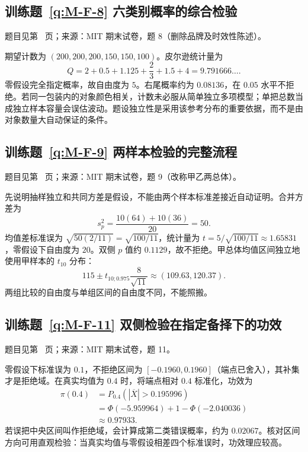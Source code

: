 \documentclass[UTF8,12pt,a4paper,fontset=fandol]{ctexbook}
\begin{document}
\subsection*{训练题~\ref{q:M-F-8} 六类别概率的综合检验}\label{a:M-F-8}{\small 题目见第~\pageref{q:M-F-8} 页；来源：MIT 期末试卷，题 8（删除品牌及时效性陈述）。}
\begin{solve}期望计数为 $(200,200,200,150,150,100)$。皮尔逊统计量为\[Q=2+0.5+1.125+\frac23+1.5+4=9.791666\ldots.\]零假设完全指定概率，故自由度为 $5$。右尾概率约为 $0.08136$，在 $0.05$ 水平不拒绝。若同一包装内的对象颜色相关，计数未必服从简单独立多项模型；单把总数当成独立样本容量会误估波动。题设独立性是采用该参考分布的重要依据，而不是由对象数量大自动保证的条件。\end{solve}

\subsection*{训练题~\ref{q:M-F-9} 两样本检验的完整流程}\label{a:M-F-9}{\small 题目见第~\pageref{q:M-F-9} 页；来源：MIT 期末试卷，题 9（改称甲乙两总体）。}
\begin{solve}先说明抽样独立和共同方差是假设，不能由两个样本标准差接近自动证明。合并方差为\[s_p^2=\frac{10(64)+10(36)}{20}=50.\]均值差标准误为 $\sqrt{50(2/11)}=\sqrt{100/11}$，统计量为 $t=5/\sqrt{100/11}\approx1.65831$，零假设下自由度为 $20$。双侧 $p$ 值约 $0.1129$，故不拒绝。甲总体均值区间独立地使用甲样本的 $t_{10}$ 分布：\[115\pm t_{10;0.975}\frac8{\sqrt{11}}\approx(109.63,120.37).\]两组比较的自由度与单组区间的自由度不同，不能照搬。\end{solve}

\subsection*{训练题~\ref{q:M-F-11} 双侧检验在指定备择下的功效}\label{a:M-F-11}{\small 题目见第~\pageref{q:M-F-11} 页；来源：MIT 期末试卷，题 11。}
\begin{solve}零假设下标准误为 $0.1$，不拒绝区间为 $[-0.1960,0.1960]$（端点已舍入），其补集才是拒绝域。在真实均值为 $0.4$ 时，将端点相对 $0.4$ 标准化，功效为\[\begin{aligned}\pi(0.4)&=P_{0.4}(|\overline X|>0.195996)\\&=\Phi(-5.959964)+1-\Phi(-2.040036)\\&\approx0.97933.\end{aligned}\]若误把中央区间叫作拒绝域，会计算成第二类错误概率，约为 $0.02067$。核对区间方向可用直观检验：当真实均值与零假设相差四个标准误时，功效理应较高。\end{solve}
\end{document}
